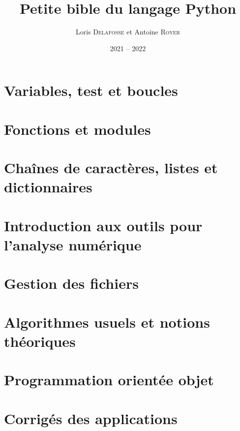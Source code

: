 \documentclass[french, a4paper, 12pt, openany]{book}
\title{\sc Petite bible du langage Python}
\author{Loris \textsc{Delafosse} et Antoine \textsc{Royer}}
\date{2021 -- 2022}
\begin{document}
 \maketitle \tableofcontents

	\chapter{Variables, test et boucles} \label{chap_1}
		
	
	\chapter{Fonctions et modules}
		
	
	\chapter{Chaînes de caractères, listes et dictionnaires}
		
	
	\chapter{Introduction aux outils pour l'analyse numérique} \label{chap_4}
		
	
	\chapter{Gestion des fichiers}
		
	
	\chapter{Algorithmes usuels et notions théoriques}
		
	
	\chapter{Programmation orientée objet}
		
	
	\chapter{Corrigés des applications}
		
\end{document}
